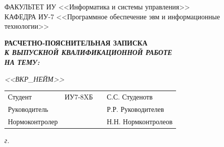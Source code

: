 \begin{titlepage}
	{
		\small \raggedright
		ФАКУЛЬТЕТ ИУ <<Информатика и системы управления>> \\
		\vspace{3.3mm}
		КАФЕДРА ИУ-7 <<Программное обеспечение эвм и информационные технологии>> \\
	}
	
	\vspace{20.8mm}
	
	{
		\LARGE \bfseries
		РАСЧЕТНО-ПОЯСНИТЕЛЬНАЯ ЗАПИСКА \\
	}
	\vspace{5mm}
	{
		\Large \bfseries \itshape
		К ВЫПУСКНОЙ КВАЛИФИКАЦИОННОЙ РАБОТЕ \\
		\vspace{5mm}
		НА ТЕМУ: \\
	}
	
	{
		\Large \itshape
		<<ВКР\_НЕЙМ>>
	}
	
	\vfill
	
	\begin{tabular}{p{}PPT}
		Студент &  ИУ7-8XБ & \uline{} & С.С. Студенотв \\
		Руководитель & ~ &  \uline{} & Р.Р. Руководителев \\
		Нормоконтролер & ~ &  \uline{} & Н.Н. Нормконтролеов \\
	\end{tabular}
	
	\vspace{14mm}
	
	\textit{{\the\year} г.}
	
\end{titlepage}